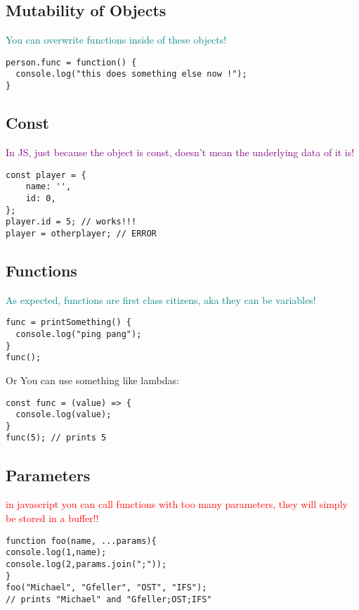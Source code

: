 \documentclass[main.tex,fontsize=6pt,paper=a4,paper=landscape,DIV=calc,]{scrartcl}
\begin{document}
\begin{multicols*}{4}
\subsection{Mutability of Objects}  
\textcolor{teal}{You can overwrite functions inside of these objects!}
\vspace{-2mm}
\begin{lstlisting}
person.func = function() {
  console.log("this does something else now !");
}
\end{lstlisting}
\vspace{2mm}

\subsection{Const}
\textcolor{purple}{In JS, just because the object is const, doesn't mean the underlying data of it is!}
\vspace{-2mm}
\begin{lstlisting}
const player = {
    name: '',
    id: 0,
};
player.id = 5; // works!!!
player = otherplayer; // ERROR
\end{lstlisting}
\vspace{2mm}

\subsection{Functions} 
\textcolor{teal}{As expected, functions are first class citizens, aka they can be variables!}
\vspace{-2mm}
\begin{lstlisting}
func = printSomething() {
  console.log("ping pang");
}
func();
\end{lstlisting}
\vspace{2mm}
Or You can use something like lambdas:
\vspace{-2mm}
\begin{lstlisting}
const func = (value) => {
  console.log(value);
}
func(5); // prints 5
\end{lstlisting}
\vspace{2mm}

\subsection{Parameters}  
\textcolor{red}{in javascript you can call functions with too many parameters, they will simply be stored in a buffer!!}
\vspace{-2mm}
\begin{lstlisting}
function foo(name, ...params){
console.log(1,name);
console.log(2,params.join(";"));
}
foo("Michael", "Gfeller", "OST", "IFS");
// prints "Michael" and "Gfeller;OST;IFS"
\end{lstlisting}
\vspace{2mm}


\end{multicols*}
\end{document}
